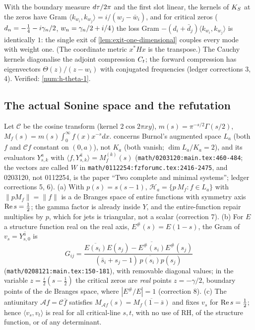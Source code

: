 \begin{proposition}
\label{prop:riemann-one-exit-gram}
With the boundary measure $d\tau/2\pi$ and the first slot linear, the kernels of $K_S$ at the zeros have Gram
$\langle k_{w_i},k_{w_j}\rangle = i/(w_j-\bar w_i)$, and for critical zeros ($d_n = -\tfrac14-i\gamma_{n}/2$,
$w_n = \gamma_{n}/2+i/4$) the loss Gram $-(d_i+\bar d_j)\langle k_{w_i},k_{w_j}\rangle$ is identically $1$: the single exit of
\cref{lem:exit-one-dimensional} couples every mode with weight one. (The coordinate metric $x^{*}Hx$ is the transpose.)
The Cauchy kernels diagonalise the adjoint compression $C_t$; the forward compression has eigenvectors
$\Theta(z)/(z-w_i)$ with conjugated frequencies (ledger corrections 3, 4). Verified: \cref{num:h-theta-1}.
\end{proposition}

\subsection{The actual Sonine space and the refutation}

\begin{proposition}
\label{prop:sonine-critical-gram-real}
Let $\mathcal C$ be the cosine transform (kernel $2\cos2\pi xy$), $m(s) = \pi^{-s/2}\Gamma(s/2)$, $M_f(s) = m(s)\int_0^\infty
f(x)x^{-s}dx$.  concerns Burnol's augmented space $L_a$ (both $f$ and $\mathcal Cf$ constant on
$(0,a)$), not $K_a$ (both vanish; $\dim L_a/K_a = 2$), and its evaluators $Y^a_{s,k}$ with $\langle f,\overline{Y^a_{s,k}}\rangle
= M_f^{(k)}(s)$ (\texttt{math/0203120:main.tex:460-484}; the vectors are called $W$ in \texttt{math/0112254:fzforumc.tex:2416-2475},
and 0203120, not 0112254, is the paper ``Two complete and minimal systems''; ledger corrections 5, 6). (a) With $p(s) = s(s-1)$,
$\mathscr H_a = \{p\,M_f: f\in L_a\}$ with $\|pM_f\| = \|f\|$ is a de Branges space of entire functions with symmetry axis
$\operatorname{Re} s = \tfrac12$; the gamma factor is already inside $Y$, and the entire-function repair multiplies by $p$, which for jets is
triangular, not a scalar (correction 7). (b) For $E$ a structure function real on the real axis, $E^\#(s) = E(1-s)$, the
Gram of $v_s = \overline{Y^a_{s,0}}$ is
\[
G_{ij} = \frac{\overline{E(s_i)}E(s_j)-\overline{E^\#(s_i)}E^\#(s_j)}{(\bar s_i+s_j-1)\,\overline{p(s_i)}p(s_j)}
\]
(\texttt{math/0208121:main.tex:150-181}), with removable diagonal values; in the variable $z = \tfrac i2(s-\tfrac12)$ the
critical zeros are \emph{real} points $z = -\gamma/2$, boundary points of the de Branges space, where $|E^\#/E| = 1$
(correction 8). (c) The antiunitary $\mathcal Af = \mathcal C\bar f$ satisfies $M_{\mathcal Af}(s) = \overline{M_f(1-\bar s)}$
and fixes $v_s$ for $\operatorname{Re} s = \tfrac12$; hence $\langle v_s,v_t\rangle$ is real for all critical-line $s,t$, with no use of RH,
of the structure function, or of any determinant.
\end{proposition}

